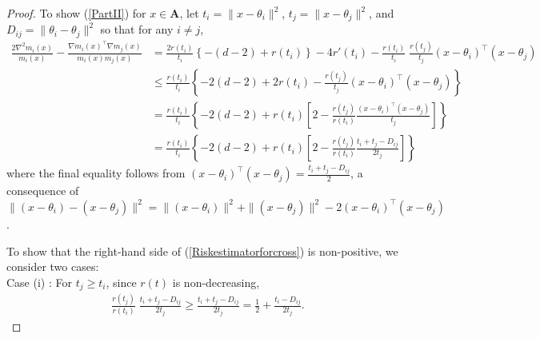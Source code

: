 \documentclass[11pt]{article}
\theoremstyle{definition}
\begin{document}
\begin{proof}
To show (\ref{PartII}) for $x \in \textbf{A}$, let $t_i  = \|x - \theta_i\|^2$,  $t_j  = \|x - \theta_j\|^2$, and  $D_{ij}  = \|\theta_i - \theta_j\|^2$ so that   for any $i \neq j$,
   \begin{align}
   \nonumber  \frac{2\nabla^2 m_i(x)}{m_i(x)} - \frac{\nabla m_i(x)^{\top}\nabla m_j(x)}{m_i(x) m_j(x)} & =  \frac{2r(t_i)}{t_i}\left\{-(d-2) + r(t_i)\right\} - 4r'(t_i) - \frac{r(t_i)}{t_i}\;\frac{r(t_j)}{t_j}(x - \theta_i)^{\top}(x - \theta_j) \\
   \nonumber & \leq \frac{r(t_i)}{t_i} \left\{-2(d-2) + 2r(t_i) - \frac{r(t_j)}{t_j}(x - \theta_i)^{\top}(x - \theta_j)\right\} \\
    \nonumber & = \frac{r(t_i)}{t_i} \left\{-2(d-2) + r(t_i)\left[ 2  - \frac{r(t_j)}{r(t_i)} \frac{(x - \theta_i)^{\top}(x - \theta_j)}{t_j}\right]\right\} \\
    & = \frac{r(t_i)}{t_i} \left\{-2(d-2) + r(t_i)\left[ 2  - \frac{r(t_j)}{r(t_i)} \frac{t_i + t_j - D_{ij}}{2t_j}\right]\right\}
    \label{Riskestimatorforcross}
\end{align}
where the final equality follows from $(x - \theta_i)^{\top}(x - \theta_j) = \frac{t_i + t_j - D_{ij}}{2}$, a consequence of
$\|(x - \theta_i) - (x - \theta_j)\|^2 = \|(x - \theta_i)\|^2 + \| (x - \theta_j)\|^2 - 2(x - \theta_i)^{\top}(x - \theta_j)$.

To show that the right-hand side of (\ref{Riskestimatorforcross}) is non-positive, we consider two cases:\\
  
  {Case (i) \hspace{-1mm}:} For $t_j \geq t_i$, since $r(t)$ is non-decreasing,
  \begin{align}
    \nonumber   \frac{r(t_j)}{r(t_i)}\; \frac{t_i + t_j - D_{ij}}{2t_j} \geq \frac{t_i + t_j - D_{ij}}{2t_j} = \frac{1}{2} + \frac{t_i  - D_{ij}}{2t_j}.
  \end{align}
  

\end{proof}
\end{document}
